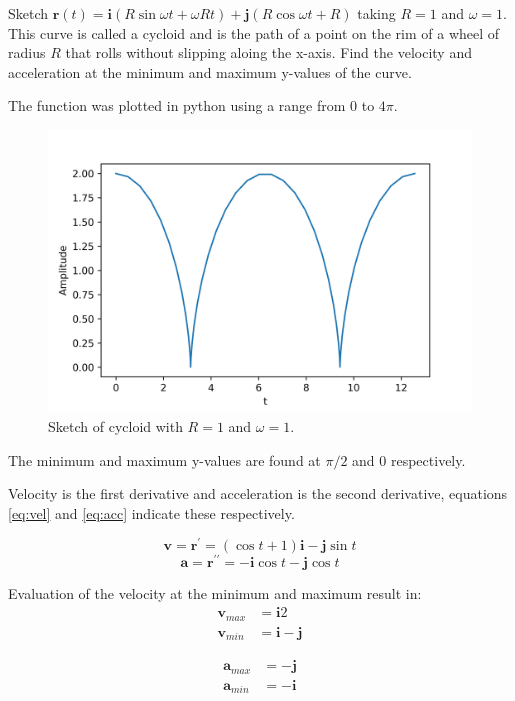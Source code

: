 Sketch $\boldsymbol{r}\left(t\right)=\boldsymbol{i}\left(R\sin \omega t +\omega Rt\right)+\boldsymbol{j}\left(R\cos \omega t +R\right)$ taking $R=1$ and $\omega=1$. This curve is called a cycloid and is the path of a point on the rim of a wheel of radius $R$ that rolls without slipping aloing the x-axis. Find the velocity and acceleration at the minimum and maximum y-values of the curve.

The function was plotted in python using a range from 0 to $4\pi$. 
\begin{figure}
	\centering
	\includegraphics[width=\linewidth]{cycloid.png}
	\caption{Sketch of cycloid with $R=1$ and $\omega=1$.}
\end{figure}

The minimum and maximum y-values are found at $\pi/2$ and 0 respectively.

Velocity is the first derivative and acceleration is the second derivative, equations \ref{eq:vel} and \ref{eq:acc} indicate these respectively.

\begin{equation}
	\boldsymbol{v}=\boldsymbol{r}^\prime=\left(\cos t +1\right)\boldsymbol{i}-\boldsymbol{j}\sin t
	\label{eq:vel}
\end{equation}
\begin{equation}
	\boldsymbol{a}=\boldsymbol{r}^{\prime\prime}=-\boldsymbol{i}\cos t-\boldsymbol{j}\cos t
	\label{eq:acc}
\end{equation}

Evaluation of the velocity at the minimum and maximum result in:
\begin{equation*}
	\boxed{
		\begin{align*}
			\boldsymbol{v}_{max}&=\boldsymbol{i}2\\
			\boldsymbol{v}_{min}&=\boldsymbol{i}-\boldsymbol{j}
		\end{align*}
	}
\end{equation*}

\begin{equation*}
	\boxed{
		\begin{align*}
			\boldsymbol{a}_{max}&=-\boldsymbol{j}\\
			\boldsymbol{a}_{min}&=-\boldsymbol{i}
		\end{align*}
	}
\end{equation*}